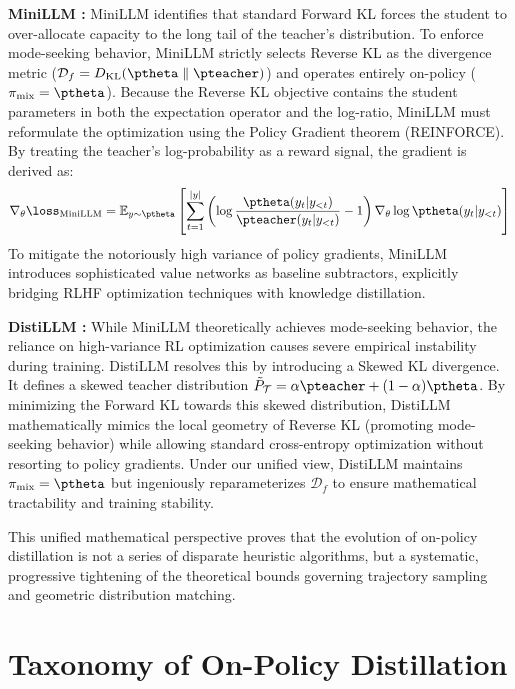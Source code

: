 \textbf{MiniLLM \citep{2306.08543}:} MiniLLM identifies that standard Forward KL forces the student to over-allocate capacity to the long tail of the teacher's distribution. To enforce mode-seeking behavior, MiniLLM strictly selects Reverse KL as the divergence metric ($\mathcal{D}_f = D_{\mathrm{KL}}(\ptheta \parallel \pteacher)$) and operates entirely on-policy ($\pi_{\mathrm{mix}} = \ptheta$). Because the Reverse KL objective contains the student parameters in both the expectation operator and the log-ratio, MiniLLM must reformulate the optimization using the Policy Gradient theorem (REINFORCE). By treating the teacher's log-probability as a reward signal, the gradient is derived as:
\begin{equation}
    \nabla_\theta \loss_{\mathrm{MiniLLM}} = \mathbb{E}_{y \sim \ptheta} \left[ \sum_{t=1}^{|y|} \left( \log \frac{\ptheta(y_t|y_{<t})}{\pteacher(y_t|y_{<t})} - 1 \right) \nabla_\theta \log \ptheta(y_t|y_{<t}) \right]
\end{equation}
To mitigate the notoriously high variance of policy gradients, MiniLLM introduces sophisticated value networks as baseline subtractors, explicitly bridging RLHF optimization techniques with knowledge distillation.

\textbf{DistiLLM \citep{2402.03898}:} While MiniLLM theoretically achieves mode-seeking behavior, the reliance on high-variance RL optimization causes severe empirical instability during training. DistiLLM resolves this by introducing a Skewed KL divergence. It defines a skewed teacher distribution $\tilde{P}_{\mathcal{T}} = \alpha \pteacher + (1-\alpha) \ptheta$. By minimizing the Forward KL towards this skewed distribution, DistiLLM mathematically mimics the local geometry of Reverse KL (promoting mode-seeking behavior) while allowing standard cross-entropy optimization without resorting to policy gradients. Under our unified view, DistiLLM maintains $\pi_{\mathrm{mix}} = \ptheta$ but ingeniously reparameterizes $\mathcal{D}_f$ to ensure mathematical tractability and training stability.

This unified mathematical perspective proves that the evolution of on-policy distillation is not a series of disparate heuristic algorithms, but a systematic, progressive tightening of the theoretical bounds governing trajectory sampling and geometric distribution matching.


\section{Taxonomy of On-Policy Distillation}
\label{sec:taxonomy}

